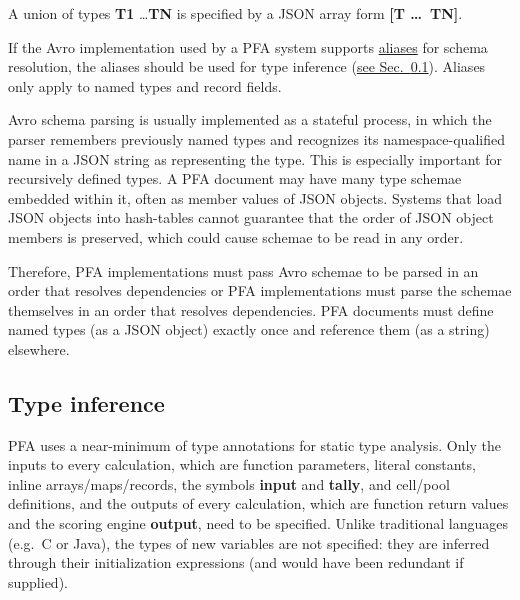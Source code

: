 \documentclass{article}
\newcommand{\PFAc}{\ttfamily\bfseries}
\newcommand{\PFAtp}{\ttfamily\bfseries}
\theoremstyle{definition}
\begin{document}
A union of types {\PFAtp T1} \ldots {\PFAtp TN} is specified by a JSON array form {\PFAc [T \ldots\ TN]}.

If the Avro implementation used by a PFA system supports \href{http://avro.apache.org/docs/1.7.6/spec.html#Aliases}{aliases} for schema resolution, the aliases should be used for type inference (\hyperlink{hsec:type-inference}{see Sec.~\ref{sec:type-inference}}).  Aliases only apply to named types and record fields.

Avro schema parsing is usually implemented as a stateful process, in which the parser remembers previously named types and recognizes its namespace-qualified name in a JSON string as representing the type.  This is especially important for recursively defined types.  A PFA document may have many type schemae embedded within it, often as member values of JSON objects.  Systems that load JSON objects into hash-tables cannot guarantee that the order of JSON object members is preserved, which could cause schemae to be read in any order.

Therefore, PFA implementations must pass Avro schemae to be parsed in an order that resolves dependencies or PFA implementations must parse the schemae themselves in an order that resolves dependencies.  PFA documents must define named types (as a JSON object) exactly once and reference them (as a string) elsewhere.

\hypertarget{hsec:type-inference}{}
\subsection{Type inference}
\label{sec:type-inference}

PFA uses a near-minimum of type annotations for static type analysis.  Only the inputs to every calculation, which are function parameters, literal constants, inline arrays/maps/records, the symbols {\PFAc input} and {\PFAc tally}, and cell/pool definitions, and the outputs of every calculation, which are function return values and the scoring engine {\PFAc output}, need to be specified.  Unlike traditional languages (e.g.\ C or Java), the types of new variables are not specified: they are inferred through their initialization expressions (and would have been redundant if supplied).
\end{document}
